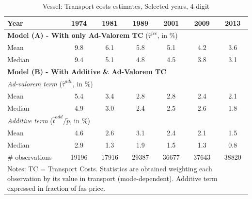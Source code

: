 \documentclass[a4paper,11pt]{article}
\begin{document}
\begin{table}[htbp]
  \centering
\caption{Vessel: Transport costs estimates, Selected years, 4-digit}
\begin{center}
    \begin{tabular}{l|cccccc}
   \hline\hline
Year & 1974  & 1981  & 1989  & 2001  & 2009  & 2013 \\
\hline
\multicolumn{7}{l}{\textbf{Model (A) - With only Ad-Valorem TC} ($\widehat{\tau}^{ice}$, in \%)} \\
\hline
Mean  & 9.8 & 6.1 & 5.8 & 5.1 & 4.2 & 3.6  \\
Median & 9.4 & 5.1 & 4.8 & 4.5 & 3.8 & 3.1 \\
\hline
\multicolumn{7}{l}{\textbf{Model (B) - With Additive \& Ad-Valorem TC} }\\ \hline
\multicolumn{7}{l}{\textit{Ad-valorem term} ($\widehat{\tau}^{adv}$, in \%) }   \\ \hline
Mean  & 5.4 & 3.4 & 2.8 & 2.8 & 2.4 & 2.1  \\
Median & 4.9 & 3.0 & 2.4 & 2.5 & 2.6 & 1.8 \\
\hline
\multicolumn{7}{l}{\textit{Additive term} ($\widehat{t}^{add}/\widetilde{p}$, in \%) }   \\ \hline
Mean  & 4.6 & 2.6 & 3.1 & 2.4 & 2.1 & 1.5  \\
Median & 2.9 & 1.3 & 1.9 & 1.5 & 1.3 & 0.8 \\
\hline
\# observations & 19196 & 17916 & \multicolumn{1}{c}{29387} & \multicolumn{1}{c}{36677} & \multicolumn{1}{c}{37643} & \multicolumn{1}{c}{38820} \\
\hline\hline
\multicolumn{7}{l}{\parbox[l]{11cm}{ \vspace{7pt}\scriptsize{Notes: TC = Transport Costs. Statistics are obtained weighting each observation by its value in transport (mode-dependent). Additive term expressed in fraction of fas price.}}}
\end{tabular}%
\end{center}
\label{tab:result_ves_rob}%
\end{table}%
\end{document}
